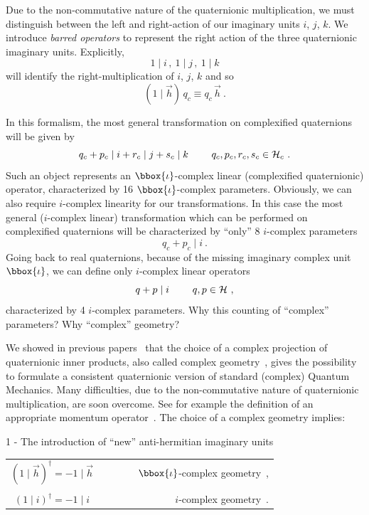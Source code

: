 Due to the non-commutative nature of the quaternionic multiplication, we must
distinguish between the left and right-action of our imaginary units 
$i$, $j$, $k$. We introduce {\em barred operators} to represent the right
action of the three quaternionic imaginary units. Explicitly,
\[ 1\mid i \, , ~1\mid j \, , ~1\mid k \]
will identify the right-multiplication of $i$, $j$, $k$ and so
\[ \left( 1 \mid \vec{h} \right) \, q_c \equiv q_c \, \vec{h} ~ . \]

In this formalism, the most general transformation on complexified quaternions
will be given by
\begin{equation} 
\label{fbo}
q_c + p_c \mid i + r_c \mid j + s_c \mid k ~~~~~~~   
q_c,p_c,r_c,s_c \in {\cal H}_c ~.
\end{equation}
Such an object represents an $\bbox{\iota}$-complex linear (complexified
quaternionic) operator, characterized by 16 $\bbox{\iota}$-complex parameters.
Obviously, we can also require $i$-complex linearity for our transformations. 
In this case the most general ($i$-complex linear) transformation which can be
performed on complexified quaternions will be characterized by ``only'' 8
$i$-complex parameters
\begin{equation} 
\label{pbo}
q_c + p_c \mid i~.
\end{equation}
Going back to real quaternions, because of the missing imaginary complex 
unit $\bbox{\iota}$, we can define only $i$-complex linear operators
\begin{equation} 
\label{rbo}
q + p \mid i~~~~~~~q,p \in {\cal H}~,
\end{equation}
characterized by 4 $i$-complex parameters. Why this counting of ``complex''
parameters? Why ``complex'' geometry?

We showed in previous papers~\cite{DR,PAP}  
that the choice of a complex projection of quaternionic inner products, 
also called complex geometry~\cite{REM}, gives the possibility to formulate a 
consistent quaternionic 
version of standard (complex) Quantum Mechanics. Many difficulties, due to
the non-commutative nature of quaternionic multiplication, are soon overcome.
See for example the definition of an appropriate momentum operator~\cite{DR}. 
The choice of a complex geometry implies:

1 - The introduction of ``new'' anti-hermitian imaginary units
\begin{center}
\begin{tabular}{cr}
$\left( 1 \mid \vec{h} \right)^{\dag} = -  1 \mid \vec{h}$
& ~~~~~~~$\bbox{\iota}$-complex geometry~,\\
 & \\
$\left( 1 \mid i \right)^{\dag} = -  1 \mid i$
& ~~~~~~~$i$-complex geometry~.
\end{tabular}
\end{center}

